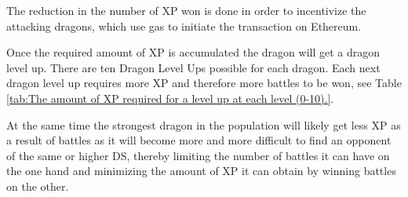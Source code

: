 \documentclass[12pt]{article}
\begin{document}
{The reduction in the number of XP won is done in order to incentivize the attacking dragons, which use gas to initiate the transaction on Ethereum.\par

Once the required amount of XP is accumulated the dragon will get a dragon level up. There are ten Dragon Level Ups possible for each dragon. Each next dragon level up requires more XP and therefore more battles to be won, see  Table \ref{tab:The amount of XP required for a level up at each level (0-10).}.\par

At the same time the strongest dragon in the population will likely get less XP as a result of battles as it will become more and more difficult to find an opponent of the same or higher DS, thereby limiting the number of battles it can have\textit{ }on the one hand and minimizing the amount of XP it can obtain by winning battles on the other.\par






}
\end{document}

